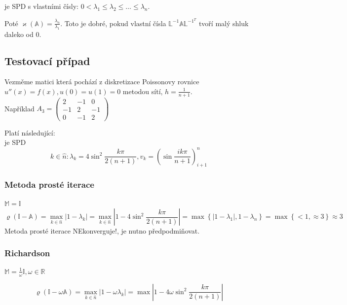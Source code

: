 \documentclass[../main.tex]{subfiles}
\begin{document}
\matA je SPD s vlastními čísly: $0 < \lambda_1 \leq \lambda_2 \leq \dots \leq \lambda_n$.

Poté $\varkappa(\mathbb{A}) = \frac{\lambda_n}{\lambda_1}$. Toto je dobré, pokud vlastní čísla $\mathbb{L}^{-1}\mathbb{A}\mathbb{L}^{-1^T}$ tvoří malý shluk daleko od 0.



\subsection{Testovací případ}
Vezměme matici \matA která pochází z diskretizace Poissonovy rovnice $u''(x)=f(x), u(0)=u(1)=0$ metodou sítí, $h = \frac{1}{n+1}$.\\

Například $A_3 = \begin{pmatrix}
    2 & -1 & 0\\
    -1 & 2 & -1 \\
    0 & -1 & 2
\end{pmatrix}$

Platí následující:\\
\matA je SPD 
\begin{equation*}
    k\in\hat{n}: \lambda_k = 4 \sin^2 \frac{k\pi}{2(n+1)}, v_k = \left( \sin \frac{i k \pi}{n+1}\right)^n_{i+1}
\end{equation*}
    
\subsubsection{Metoda prosté iterace}
$\mathbb{M} = \mathbb{I}$
\begin{equation*}
    \varrho(\mathbb{I} - \mathbb{A}) = \max_{k\in\hat{n}} |1-\lambda_k| = \max_{k\in\hat{n}} |1 - 4 \sin^2 \frac{k\pi}{2(n+1)}|
    = \max \left\{ |1-\lambda_1|, 1 - \lambda_n  \right\} = \max \left\{ < 1, \approx 3  \right\} \approx 3
\end{equation*}
Metoda prosté iterace NEkonverguje!, je nutno předpodmiňovat.



\subsubsection{Richardson}
$\mathbb{M} = \frac{1}{\omega} \mathbb{I}, \omega\in\mathbb{R}$


\begin{equation*}
    \varrho(\mathbb{I} - \omega \mathbb{A}) = \max_{k\in\hat{n}} |1-\omega\lambda_k| = \max |1 - 4\omega \sin^2 \frac{k\pi}{2(n+1)}|
\end{equation*}
\end{document}
